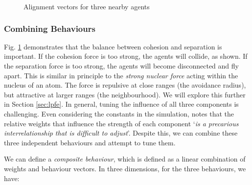 \documentclass[12pt]{article}
\begin{document}
\begin{figure}[ht]
    \centering
    \caption{Alignment vectors for three nearby agents}
    \label{fig:cohesion-2d}
\end{figure}

\subsubsection{Combining Behaviours}
\label{sec:combining-behaviours}

Fig. \ref{fig:cohesion-2d} demonstrates that the balance between cohesion and separation is important. If the cohesion force is too strong, the agents will collide, as shown. If the separation force is too strong, the agents will become disconnected and fly apart. This is similar in principle to the \emph{strong nuclear force} acting within the nucleus of an atom. The force is repulsive at close ranges (the avoidance radius), but attractive at larger ranges (the neighbourhood). We will explore this further in Section \ref{sec:lpfe}. In general, tuning the influence of all three components is challenging. Even considering the constants in the simulation, \citet{Reynolds} notes that the relative weights that influence the strength of each component `\emph{is a precarious interrelationship that is difficult to adjust}'. Despite this, we can combine these three independent behaviours and attempt to tune them. 

We can define a \emph{composite behaviour}, which is defined as a linear combination of weights and behaviour vectors. In three dimensions, for the three behaviours, we have:
\end{document}

